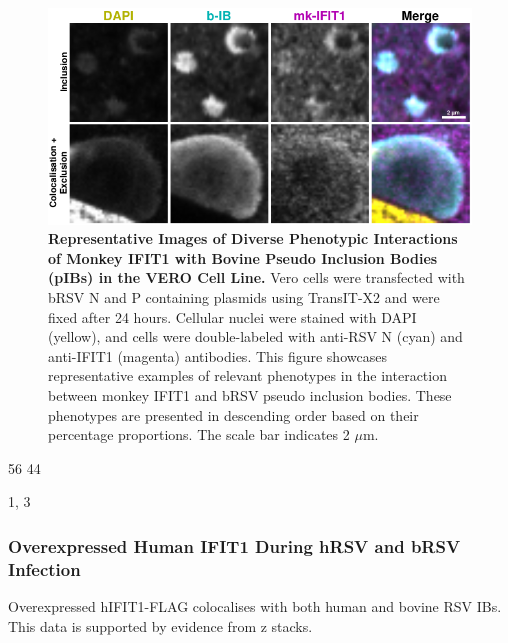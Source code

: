 \begin{figure}
    \centering
    \includegraphics[width=1\linewidth]{09. Chapter 4/Figs/01. pIB/02. IFIT1/09. i1-vero-bnbp.pdf}
    \caption[Representative Images of Diverse Phenotypic Interactions of Monkey IFIT1 with Bovine Pseudo Inclusion Bodies (pIBs) in the VERO Cell Line.]{\textbf{Representative Images of Diverse Phenotypic Interactions of Monkey IFIT1 with Bovine Pseudo Inclusion Bodies (pIBs) in the VERO Cell Line.} Vero cells were transfected with bRSV N and P containing plasmids using TransIT-X2 and were fixed after 24 hours. Cellular nuclei were stained with DAPI (yellow), and cells were double-labeled with anti-RSV N (cyan) and anti-IFIT1 (magenta) antibodies. This figure showcases representative examples of relevant phenotypes in the interaction between monkey IFIT1 and bRSV pseudo inclusion bodies. These phenotypes are presented in descending order based on their percentage proportions. The scale bar indicates 2 \(\mu \mbox{m}\).}
    \label{fig:Representative Images of Diverse Phenotypic Interactions of Monkey IFIT1 with Bovine Pseudo Inclusion Bodies (pIBs) in the VERO Cell Line}
\end{figure}

56 44

1, 3

\subsubsection{Overexpressed Human IFIT1 During hRSV and bRSV Infection}
Overexpressed hIFIT1-FLAG colocalises with both human and bovine RSV IBs. This data is supported by evidence from z stacks.

